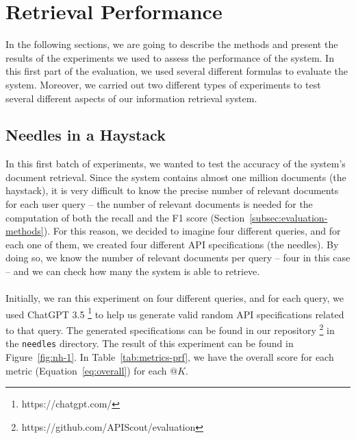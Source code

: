 \section{Retrieval Performance}\label{sec:retrieval-performance}
In the following sections, we are going to describe the methods and present the results of the experiments we used to assess the performance of the system.
In this first part of the evaluation, we used several different formulas to evaluate the system.
Moreover, we carried out two different types of experiments to test several different aspects of our information retrieval system.

\subsection{Needles in a Haystack}\label{subsec:needles-in-a-haystack}
In this first batch of experiments, we wanted to test the accuracy of the system's document retrieval.
Since the system contains almost one million documents (the haystack), it is very difficult to know the precise number of relevant documents for each user query -- the number of relevant documents is needed for the computation of both the recall and the F1 score (Section~\ref{subsec:evaluation-methods}).
For this reason, we decided to imagine four different queries, and for each one of them, we created four different API specifications (the needles).
By doing so, we know the number of relevant documents per query -- four in this case -- and we can check how many the system is able to retrieve. \\ \\
Initially, we ran this experiment on four different queries, and for each query, we used ChatGPT 3.5 \footnote{https://chatgpt.com/} to help us generate valid random API specifications related to that query.
The generated specifications can be found in our repository \footnote{https://github.com/APIScout/evaluation} in the \verb|needles| directory.
The result of this experiment can be found in Figure~\ref{fig:nh-1}.
In Table~\ref{tab:metrics-prf}, we have the overall score for each metric (Equation~\ref{eq:overall}) for each $@K$.

